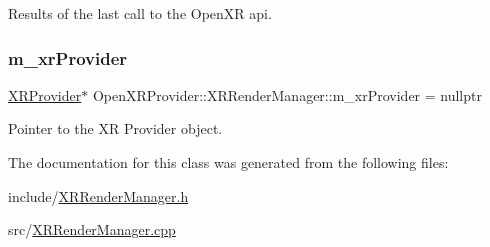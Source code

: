 Results of the last call to the Open\+XR api. 

\mbox{\label{class_open_x_r_provider_1_1_x_r_render_manager_a93496eb096c4b871d404db68d01787a8}} 
\subsubsection{\texorpdfstring{m\_xrProvider}{m\_xrProvider}}
{\footnotesize\ttfamily \mbox{\hyperlink{class_open_x_r_provider_1_1_x_r_provider}{X\+R\+Provider}}$\ast$ Open\+X\+R\+Provider\+::\+X\+R\+Render\+Manager\+::m\+\_\+xr\+Provider = nullptr\hspace{0.3cm}{\ttfamily [private]}}



Pointer to the XR Provider object. 



The documentation for this class was generated from the following files\+:\begin{DoxyCompactItemize}
\item 
include/\mbox{\hyperlink{_x_r_render_manager_8h}{X\+R\+Render\+Manager.\+h}}\item 
src/\mbox{\hyperlink{_x_r_render_manager_8cpp}{X\+R\+Render\+Manager.\+cpp}}\end{DoxyCompactItemize}
